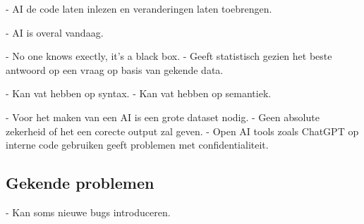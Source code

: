 
- AI de code laten inlezen en veranderingen laten toebrengen.


- AI is overal vandaag.


- No one knows exectly, it's a black box.
- Geeft statistisch gezien het beste antwoord op een vraag op basis van gekende data.


- Kan vat hebben op syntax.
- Kan vat hebben op semantiek.


- Voor het maken van een AI is een grote dataset nodig.
- Geen absolute zekerheid of het een corecte output zal geven.
- Open AI tools zoals ChatGPT op interne code gebruiken geeft problemen met confidentialiteit.

\subsection{Gekende problemen}
\label{ch:stand-van-zaken:refactoring:known-problems}


- Kan soms nieuwe bugs introduceren.









